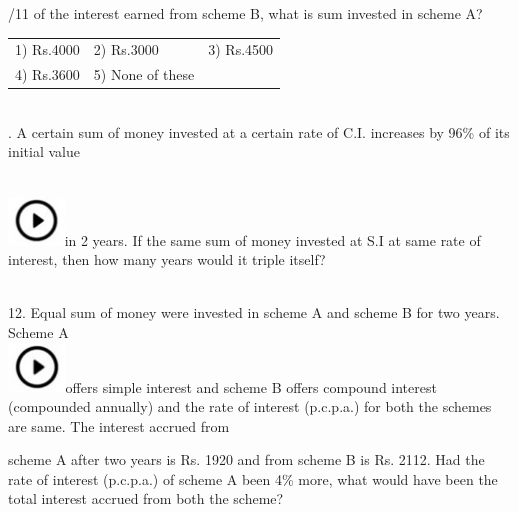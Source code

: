 \documentclass{article}
\begin{document}
	\noindent 
	
	/11 of the interest earned from scheme B, what is sum invested in scheme A?
	
	\noindent 
	
	\noindent \begin{tabular}{p{1.7in} p{1.6in} p{1.6in}} \\ 
 1) Rs.4000              & 2) Rs.3000        & 3) Rs.4500        \\
4) Rs.3600        & 5) None of these  \\
\end{tabular}
	
	\noindent 
	
	\noindent  \\  
	
	. A certain sum of money invested at a certain rate of C.I. increases by 96\% of its initial value
	
	\noindent 
	
	\noindent \noindent \\ \includegraphics*[width=0.59in, height=0.52in]{images/image1}in 2 years. If the same sum of money invested at S.I at same rate of interest, then how many years would it triple itself?
	
	\noindent 
	
	\noindent 
	
	\noindent  \\  
	
	12. Equal sum of money were invested in scheme A and scheme B for two years. Scheme A \noindent \\ \includegraphics*[width=0.60in, height=0.52in]{images/image1}offers simple interest and scheme B offers compound interest (compounded annually) and the  rate  of interest (p.c.p.a.) for both the  schemes are  same. The  interest accrued from
	
	\noindent 
	
	\noindent scheme A after two years is Rs. 1920 and from scheme B is Rs. 2112. Had the rate of interest (p.c.p.a.) of scheme A been 4\% more, what would have been the total interest accrued from both the scheme?
	
\end{document}
